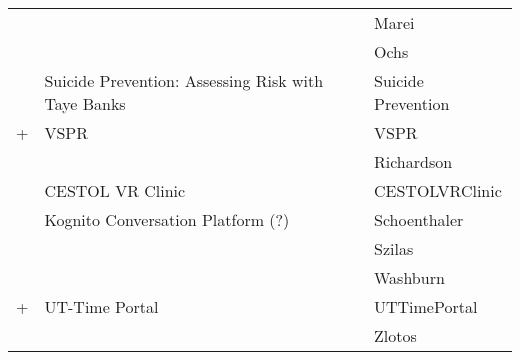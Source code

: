 {\begin{tabularx}{\linewidth} {X | X | X}
\cite{marei2018use} &  & Marei \cite{marei2018use}\\ 

\cite{ochs2019training} &  & Ochs \cite{ochs2019training}\\

\cite{o2019suicide} & Suicide Prevention: Assessing
Risk with Taye Banks & Suicide Prevention \cite{o2019suicide}\\ 

\cite{peddle2019exploring} + \cite{peddle2019development} & VSPR & VSPR \cite{peddle2019exploring,peddle2019development}\\ 

\cite{richardson2019virtual} &  & Richardson \cite{richardson2019virtual}\\

\cite{sapkaroski2018implementation} & CESTOL VR Clinic & CESTOLVRClinic \cite{sapkaroski2018implementation}\\ 

\cite{schoenthaler2017simulated} & Kognito Conversation Platform (?) & Schoenthaler \cite{schoenthaler2017simulated}\\ 

\cite{szilas2019virtual} &  & Szilas \cite{szilas2019virtual}\\ 

\cite{washburn2020virtual} &  & Washburn \cite{washburn2020virtual}\\ 

\cite{zielke2016beyond} + \cite{zielke2016using} & UT-Time Portal & UTTimePortal \cite{zielke2016beyond,zielke2016using}\\ 

\cite{zlotos2016scenario} &  & Zlotos \cite{zlotos2016scenario}\\ 

\hline
\end{tabularx}
}

\normalsize